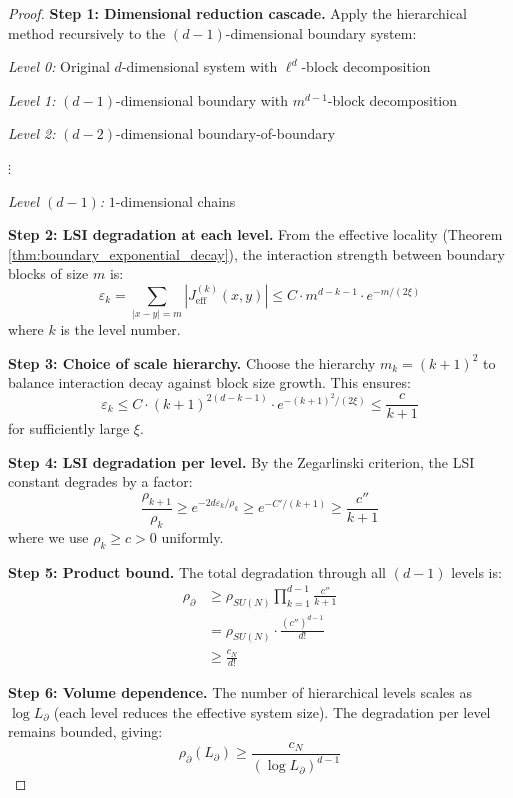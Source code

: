 \begin{proof}
\textbf{Step 1: Dimensional reduction cascade.}
Apply the hierarchical method recursively to the $(d-1)$-dimensional boundary system:

\textit{Level 0:} Original $d$-dimensional system with $\ell^d$-block decomposition

\textit{Level 1:} $(d-1)$-dimensional boundary with $m^{d-1}$-block decomposition  

\textit{Level 2:} $(d-2)$-dimensional boundary-of-boundary

$\vdots$

\textit{Level $(d-1)$:} $1$-dimensional chains

\textbf{Step 2: LSI degradation at each level.}
From the effective locality (Theorem \ref{thm:boundary_exponential_decay}), the interaction strength between boundary blocks of size $m$ is:
\begin{equation}
\varepsilon_k = \sum_{|x-y|=m} |J_{\text{eff}}^{(k)}(x,y)| \leq C \cdot m^{d-k-1} \cdot e^{-m/(2\xi)}
\end{equation}
where $k$ is the level number.

\textbf{Step 3: Choice of scale hierarchy.}
Choose the hierarchy $m_k = (k+1)^2$ to balance interaction decay against block size growth. This ensures:
\begin{equation}
\varepsilon_k \leq C \cdot (k+1)^{2(d-k-1)} \cdot e^{-(k+1)^2/(2\xi)} \leq \frac{c}{k+1}
\end{equation}
for sufficiently large $\xi$.

\textbf{Step 4: LSI degradation per level.}
By the Zegarlinski criterion, the LSI constant degrades by a factor:
\begin{equation}
\frac{\rho_{k+1}}{\rho_k} \geq e^{-2d\varepsilon_k/\rho_k} \geq e^{-C'/(k+1)} \geq \frac{c''}{k+1}
\end{equation}
where we use $\rho_k \geq c > 0$ uniformly.

\textbf{Step 5: Product bound.}
The total degradation through all $(d-1)$ levels is:
\begin{align}
\rho_{\partial} &\geq \rho_{SU(N)} \prod_{k=1}^{d-1} \frac{c''}{k+1} \\
&= \rho_{SU(N)} \cdot \frac{(c'')^{d-1}}{d!} \\
&\geq \frac{c_N}{d!}
\end{align}

\textbf{Step 6: Volume dependence.}
The number of hierarchical levels scales as $\log L_{\partial}$ (each level reduces the effective system size). The degradation per level remains bounded, giving:
\begin{equation}
\rho_{\partial}(L_{\partial}) \geq \frac{c_N}{(\log L_{\partial})^{d-1}}
\end{equation}
\end{proof}

